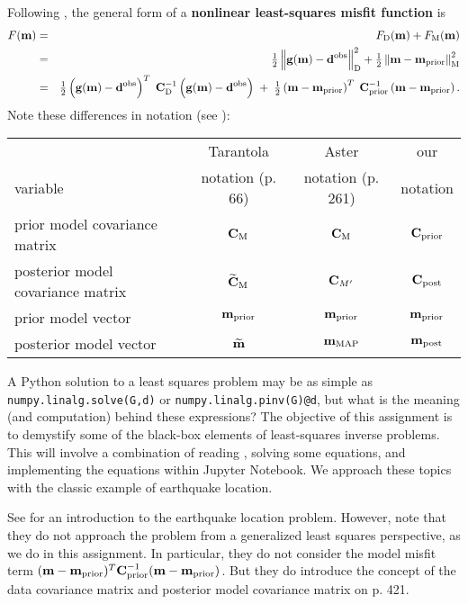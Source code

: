 \documentclass[11pt,titlepage,fleqn]{article}
\begin{document}
Following \citet[][p.~205]{Tarantola2005}, the general form of a {\bf nonlinear least-squares misfit function} is
%
\begin{eqnarray*}
\misfitvar(\mvec) &=& \misfitvar_{\rm D}(\mvec) + \misfitvar_{\rm M}(\mvec) 
\\
&=& \hlf \left\| \bg(\mvec) - \dvec \right\|^2_{\rm D} + \hlf \left\| \mvec - \mprior \right\|^2_{\rm M}
\nonumber \\
&=& \hlf \left( \bg(\mvec) - \dvec\right)^T \; \covdi \left( \bg(\mvec) - \dvec \right)
\;+\; \hlf \left( \mvec - \mprior \right)^T \; \cpriori \left( \mvec - \mprior \right).
\nonumber
\end{eqnarray*}
%
Note these differences in notation (see ):

\vspace{0.2cm}
\begin{tabular}{l|c|c|c}
\hline
                                    & Tarantola         & Aster    & our \\ 
variable                            & notation (p. 66) & notation (p. 261)  & notation \\ \hline
prior model covariance matrix       & $\mbox{${\bf C}$}_{\rm M}$                & $\mbox{${\bf C}$}_{\rm M}$    & $\mbox{${\bf C}$}_{\rm prior}$    \\ \hline
posterior model covariance matrix   & $\widetilde{\mbox{${\bf C}$}}_{\rm M}$    & $\mbox{${\bf C}$}_{M'}$      & $\mbox{${\bf C}$}_{\rm post}$     \\ \hline
prior model vector                  & $\mbox{${\bf m}$}_{\rm prior}$                  & $\mbox{${\bf m}$}_{\rm prior}$      & $\mbox{${\bf m}$}_{\rm prior}$     \\ \hline
posterior model vector              & $\widetilde{\mbox{${\bf m}$}}$         & $\mbox{${\bf m}$}_{\rm MAP}$ & $\mbox{${\bf m}$}_{\rm post}$     \\ \hline
\hline
\end{tabular}
\vspace{0.2cm}

A Python solution to a least squares problem may be as simple as \verb+numpy.linalg.solve(G,d)+ or \verb+numpy.linalg.pinv(G)@d+, but what is the meaning (and computation) behind these expressions? The objective of this assignment is to demystify some of the black-box elements of least-squares inverse problems. This will involve a combination of reading \citet{Tarantola2005}, solving some equations, and implementing the equations within Jupyter Notebook. We approach these topics with the classic example of earthquake location.

See \citet[][Chapter 7]{SteinWysession} for an introduction to the earthquake location problem. However, note that they do not approach the problem from a generalized least squares perspective, as we do in this assignment. In particular, they do not consider the model misfit term $(\mbox{${\bf m}$}-\mbox{${\bf m}$}_{\rm prior})^T \mbox{${\bf C}$}_{\rm prior}^{-1} (\mbox{${\bf m}$}-\mbox{${\bf m}$}_{\rm prior})$. But they do introduce the concept of the data covariance matrix and posterior model covariance matrix on p. 421.
\end{document}
